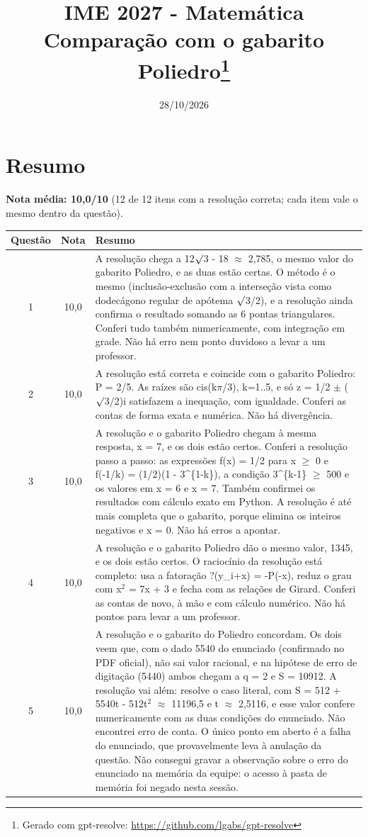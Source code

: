 \documentclass{article}%
\title{IME 2027 {-} Matemática\\[4pt]\large Comparação com o gabarito Poliedro\thanks{Gerado com gpt-resolve: \url{https://github.com/lgabs/gpt-resolve}}}%
\date{28/10/2026}%
\begin{document}
%
\normalsize%
\maketitle%
\section*{Resumo}\textbf{Nota média: 10,0/10} (12 de 12 itens com a resolução correta; cada item vale o mesmo dentro da questão).\par\medskip%
\begin{longtable}{@{}c c p{}@{}}\toprule Questão & Nota & Resumo \\ \midrule
1 & 10,0 & A resolução chega a 12$\surd$3 - 18 $\approx$ 2,785, o mesmo valor do gabarito Poliedro, e as duas estão certas. O método é o mesmo (inclusão{-}exclusão com a interseção vista como dodecágono regular de apótema $\surd$3/2), e a resolução ainda confirma o resultado somando as 6 pontas triangulares. Conferi tudo também numericamente, com integração em grade. Não há erro nem ponto duvidoso a levar a um professor. \\
2 & 10,0 & A resolução está correta e coincide com o gabarito Poliedro: P = 2/5. As raízes são cis(k$\pi$/3), k=1..5, e só z = 1/2 $\pm$ ($\surd$3/2)i satisfazem a inequação, com igualdade. Conferi as contas de forma exata e numérica. Não há divergência. \\
3 & 10,0 & A resolução e o gabarito Poliedro chegam à mesma resposta, x = 7, e os dois estão certos. Conferi a resolução passo a passo: as expressões f(x) = 1/2 para x $\geq$ 0 e f(-1/k) = (1/2)(1 - 3\^{}\{1-k\}), a condição 3\^{}\{k-1\} $\geq$ 500 e os valores em x = 6 e x = 7. Também confirmei os resultados com cálculo exato em Python. A resolução é até mais completa que o gabarito, porque elimina os inteiros negativos e x = 0. Não há erros a apontar. \\
4 & 10,0 & A resolução e o gabarito Poliedro dão o mesmo valor, 1345, e os dois estão certos. O raciocínio da resolução está completo: usa a fatoração ?(y\_i+x) = -P(-x), reduz o grau com x$^2$ = 7x + 3 e fecha com as relações de Girard. Conferi as contas de novo, à mão e com cálculo numérico. Não há pontos para levar a um professor. \\
5 & 10,0 & A resolução e o gabarito do Poliedro concordam. Os dois veem que, com o dado 5540 do enunciado (confirmado no PDF oficial), não sai valor racional, e na hipótese de erro de digitação (5440) ambos chegam a q = 2 e S = 10912. A resolução vai além: resolve o caso literal, com S = 512 + 5540t - 512t$^2$ $\approx$ 11196,5 e t $\approx$ 2,5116, e esse valor confere numericamente com as duas condições do enunciado. Não encontrei erro de conta. O único ponto em aberto é a falha do enunciado, que provavelmente leva à anulação da questão. Não consegui gravar a observação sobre o erro do enunciado na memória da equipe: o acesso à pasta de memória foi negado nesta sessão. \\

\end{longtable}
\end{document}
